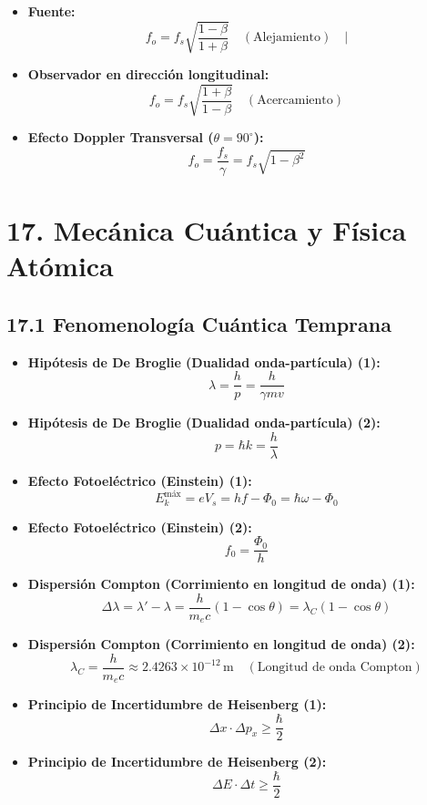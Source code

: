 \documentclass[11pt,a4paper]{article}
\begin{document}
\begin{itemize}
  \item \textbf{Fuente:}
  \[
    f_o = f_s \sqrt{\frac{1 - \beta}{1 + \beta}} \quad (\text{Alejamiento}) \quad |
  \]
  \item \textbf{Observador en dirección longitudinal:}
  \[
    f_o = f_s \sqrt{\frac{1 + \beta}{1 - \beta}} \quad (\text{Acercamiento})
  \]
  \item \textbf{Efecto Doppler Transversal ($\theta = 90^\circ$):}
  \[
    f_o = \frac{f_s}{\gamma} = f_s \sqrt{1 - \beta^2}
  \]
\end{itemize}

\section*{17. Mecánica Cuántica y Física Atómica}

\subsection*{17.1 Fenomenología Cuántica Temprana}

\begin{itemize}
  \item \textbf{Hipótesis de De Broglie (Dualidad onda-partícula) (1):}
  \[
    \lambda = \frac{h}{p} = \frac{h}{\gamma m v}
  \]
  \item \textbf{Hipótesis de De Broglie (Dualidad onda-partícula) (2):}
  \[
    p = \hbar k = \frac{h}{\lambda}
  \]
  \item \textbf{Efecto Fotoeléctrico (Einstein) (1):}
  \[
    E_k^{\mathrm{máx}} = e V_s = h f - \Phi_0 = \hbar \omega - \Phi_0
  \]
  \item \textbf{Efecto Fotoeléctrico (Einstein) (2):}
  \[
    f_0 = \frac{\Phi_0}{h}
  \]
  \item \textbf{Dispersión Compton (Corrimiento en longitud de onda) (1):}
  \[
    \Delta\lambda = \lambda' - \lambda = \frac{h}{m_e c}(1 - \cos\theta) = \lambda_C (1 - \cos\theta)
  \]
  \item \textbf{Dispersión Compton (Corrimiento en longitud de onda) (2):}
  \[
    \lambda_C = \frac{h}{m_e c} \approx 2.4263 \times 10^{-12} \, \mathrm{m} \quad (\text{Longitud de onda Compton})
  \]
  \item \textbf{Principio de Incertidumbre de Heisenberg (1):}
  \[
    \Delta x \cdot \Delta p_x \ge \frac{\hbar}{2}
  \]
  \item \textbf{Principio de Incertidumbre de Heisenberg (2):}
  \[
    \Delta E \cdot \Delta t \ge \frac{\hbar}{2}
  \]
\end{itemize}
\end{document}
